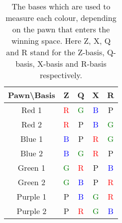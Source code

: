 \documentclass[final,5p,times,twocolumn,authoryear]{elsarticle}
\begin{document}
\begin{table}[H]
    \centering
    \caption{The bases which are used to measure each colour, depending on the pawn that enters the winning space. Here Z, X, Q and R stand for the Z-basis, Q-basis, X-basis and R-basis respectively.}
    \begin{tabular}{|c|c|c|c|c|}
        \hline
        Pawn\textbackslash Basis  & Z & Q & X & R \\
        \hline
        Red 1 & \textcolor{red}{R} & \textcolor{green}{G} & \textcolor{blue}{B} & \textcolor{Mulberry}{P} \\ 
        \hline
        Red 2 & \textcolor{red}{R} & \textcolor{Mulberry}{P} & \textcolor{blue}{B} & \textcolor{green}{G} \\ 
        \hline
        Blue 1 & \textcolor{blue}{B} & \textcolor{Mulberry}{P} & \textcolor{red}{R} & \textcolor{green}{G} \\
        \hline
        Blue 2 & \textcolor{blue}{B} & \textcolor{green}{G} & \textcolor{red}{R} & \textcolor{Mulberry}{P} \\ 
        \hline
        Green 1 & \textcolor{green}{G} & \textcolor{red}{R} & \textcolor{Mulberry}{P} & \textcolor{blue}{B} \\
        \hline
        Green 2 & \textcolor{green}{G} & \textcolor{blue}{B} & \textcolor{Mulberry}{P} & \textcolor{red}{R}  \\ 
        \hline
        Purple 1 & \textcolor{Mulberry}{P} & \textcolor{blue}{B} & \textcolor{green}{G} & \textcolor{red}{R} \\ 
        \hline
        Purple 2 & \textcolor{Mulberry}{P} & \textcolor{red}{R} & \textcolor{green}{G} & \textcolor{blue}{B} \\
        \hline
    \end{tabular}
    \label{tab:MeasureBasisonTrigger}
\end{table}

\end{document}
